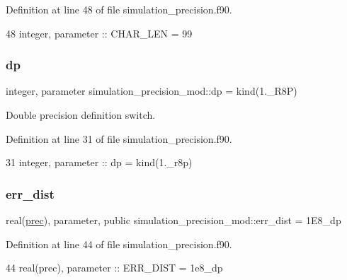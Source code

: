 Definition at line 48 of file simulation\+\_\+precision.\+f90.


\begin{DoxyCode}
48     \textcolor{keywordtype}{integer}, \textcolor{keywordtype}{parameter} :: CHAR\_LEN = 99
\end{DoxyCode}
\mbox{\label{namespacesimulation__precision__mod_a4d49b0033a5e2bc6693c5b2dfb63a032}} 
\subsubsection{\texorpdfstring{dp}{dp}}
{\footnotesize\ttfamily integer, parameter simulation\+\_\+precision\+\_\+mod\+::dp = kind(1.\+\_\+\+R8P)\hspace{0.3cm}{\ttfamily [private]}}



Double precision definition switch. 



Definition at line 31 of file simulation\+\_\+precision.\+f90.


\begin{DoxyCode}
31     \textcolor{keywordtype}{integer},  \textcolor{keywordtype}{parameter} :: dp  = kind(1.\_r8p)   
\end{DoxyCode}
\mbox{\label{namespacesimulation__precision__mod_ae3222dd2d51f6b7221be1ca1c70e3e6c}} 
\subsubsection{\texorpdfstring{err\+\_\+dist}{err\_dist}}
{\footnotesize\ttfamily real(\mbox{\hyperlink{namespacesimulation__precision__mod_aaff1ddf996761a1e11e787d63e1612f6}{prec}}), parameter, public simulation\+\_\+precision\+\_\+mod\+::err\+\_\+dist = 1\+E8\+\_\+dp}



Definition at line 44 of file simulation\+\_\+precision.\+f90.


\begin{DoxyCode}
44     \textcolor{keywordtype}{real(prec)}, \textcolor{keywordtype}{parameter} :: ERR\_DIST = 1e8\_dp
\end{DoxyCode}
\mbox{\label{namespacesimulation__precision__mod_a82a4b689dc26018c961193b991c489d4}} 
